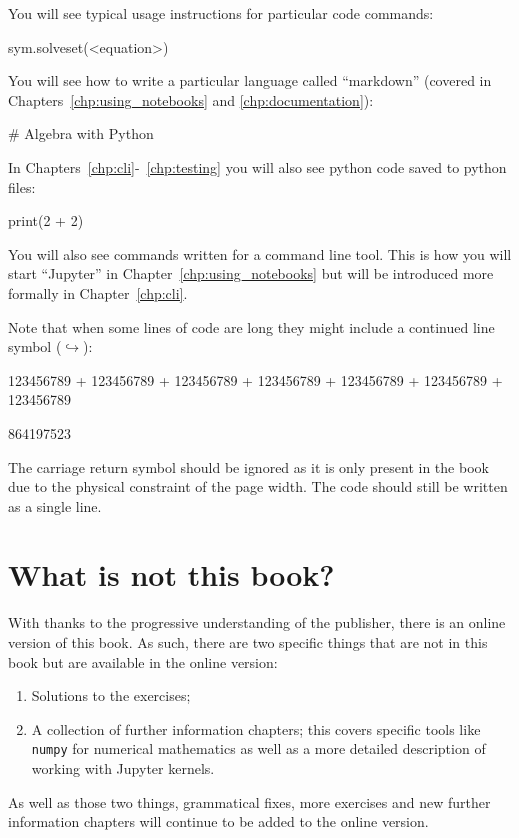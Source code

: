 You will see typical usage instructions for particular code commands:

\begin{api}
sym.solveset(<equation>)
\end{api}

You will see how to write a particular language called ``markdown'' (covered in
Chapters~\ref{chp:using_notebooks} and \ref{chp:documentation}):

\begin{md}
# Algebra with Python
\end{md}

In Chapters~\ref{chp:cli}-~\ref{chp:testing} you will also see python code saved
to python files:

\begin{python}
print(2 + 2)
\end{python}

You will also see commands written for a command line tool. This is how you will
start ``Jupyter'' in Chapter~\ref{chp:using_notebooks} but will be introduced
more formally in Chapter~\ref{chp:cli}.


Note that when some lines of code are long they might include a continued line 
symbol (\(\hookrightarrow\)):

\begin{pyin}
    123456789 + 123456789 + 123456789 + 123456789 + 123456789 + 123456789 + 123456789
\end{pyin}

\begin{raw}
864197523
\end{raw}

The carriage return symbol should be ignored as it is only present in the book
due to the physical constraint of the page width. The code should still be written as a single line.

\section{What is \textbf{not} this book?}

With thanks to the progressive understanding of the publisher, there is an online version of this book.
As such, there are two specific things that are not in this book but are
available in the online version:

\begin{enumerate}
    \item Solutions to the exercises;
    \item A collection of further information chapters; this covers specific
        tools like \texttt{numpy} for numerical mathematics as well as a more
        detailed description of working with Jupyter kernels.
\end{enumerate}

As well as those two things, grammatical fixes, more exercises and new further
information chapters will continue to be added to the online version.

